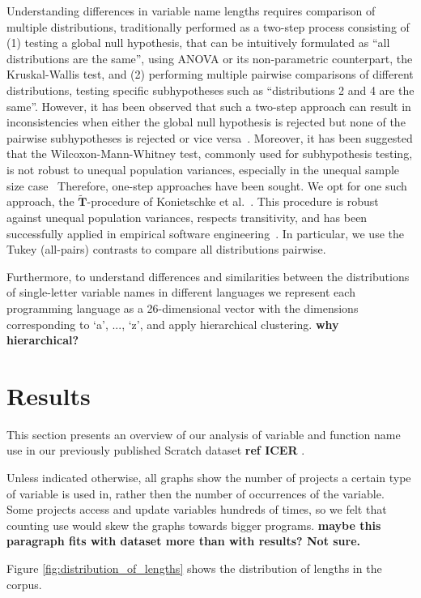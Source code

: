 \documentclass[conference]{IEEEtran}
\newcommand{\todo}[1]{ \textbf{#1} }
\begin{document}
Understanding differences in variable name lengths requires comparison of multiple distributions, traditionally performed as a two-step process consisting of (1) testing a global null hypothesis, that can be intuitively formulated as ``all distributions are the same'', using ANOVA or its non-parametric counterpart, the Kruskal-Wallis test, and (2) performing multiple pairwise comparisons of different distributions, testing specific subhypotheses such as ``distributions 2 and 4 are the same''. 
However, it has been observed that such a two-step approach can result in inconsistencies when either the global null hypothesis is rejected but none of the pairwise subhypotheses is rejected or vice versa~\cite{Gabriel}. 
Moreover, it has been suggested that the Wilcoxon-Mann-Whitney test, commonly used for subhypothesis testing, is not robust to unequal population variances, especially in the unequal sample size case~\cite{Zimmerman:Zumbo}
Therefore, one-step approaches have been sought.
We opt for one such approach, the $\widetilde{\mathbf{T}}$-procedure of Konietschke et al.~\cite{Konietschke:Hothorn:Brunner}. 
This procedure is robust against unequal population variances, respects transitivity, and has been successfully applied in empirical software engineering~\cite{VasilescuSGM14,VasilescuCS14,YuWYW16}.
In particular, we use the Tukey (all-pairs) contrasts to compare all distributions pairwise.

Furthermore, to understand differences and similarities between the distributions of single-letter variable names in different languages we represent each programming language as a 26-dimensional vector with the dimensions corresponding to `a', ..., `z', and apply hierarchical clustering. \todo{why hierarchical?}


 \section{Results}
This section presents an overview of our analysis of variable and function name use in our previously published Scratch dataset \todo{ref ICER}. 

Unless indicated otherwise, all graphs show the number of projects a certain type of variable is used in, rather then the number of occurrences of the variable. Some projects access and update variables hundreds of times, so we felt that counting use would skew the graphs towards bigger programs.
\todo{maybe this paragraph fits with dataset more than with results? Not sure.}

Figure \ref{fig:distribution_of_lengths} shows the distribution of lengths in the corpus.
\end{document}

